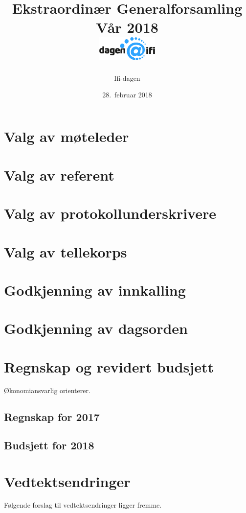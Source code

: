 \documentclass[10pt,norsk,a4paper]{article}
\title{Ekstraordinær Generalforsamling \\
	Vår 2018\\[3cm]
	\includegraphics[width=3cm,trim=0 4cm 0 0]{../res/logo.png}\\}
\date{28.\ februar 2018}
\author{Ifi-dagen}
\begin{document}
\maketitle{}
\newpage
\tableofcontents{}
\newpage


\section{Valg av møteleder}

\section{Valg av referent}

\section{Valg av protokollunderskrivere}

\section{Valg av tellekorps}

\section{Godkjenning av innkalling}

\section{Godkjenning av dagsorden}

\section{Regnskap og revidert budsjett}
Økonomiansvarlig orienterer.
\subsection{Regnskap for 2017}

\subsection{Budsjett for 2018}

\section{Vedtektsendringer}
Følgende forslag til vedtektsendringer ligger fremme.
\end{document}
